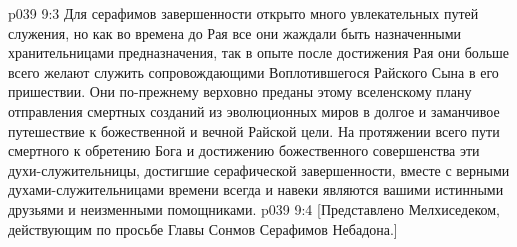 \vs p039 9:3 Для серафимов завершенности открыто много увлекательных путей служения, но как во времена до Рая все они жаждали быть назначенными хранительницами предназначения, так в опыте после достижения Рая они больше всего желают служить сопровождающими Воплотившегося Райского Сына в его пришествии. Они по\hyp{}прежнему верховно преданы этому вселенскому плану отправления смертных созданий из эволюционных миров в долгое и заманчивое путешествие к божественной и вечной Райской цели. На протяжении всего пути смертного к обретению Бога и достижению божественного совершенства эти духи\hyp{}служительницы, достигшие серафической завершенности, вместе с верными духами\hyp{}служительницами времени всегда и навеки являются вашими истинными друзьями и неизменными помощниками.
\vsetoff
\vs p039 9:4 [Представлено Мелхиседеком, действующим по просьбе Главы Сонмов Серафимов Небадона.]
